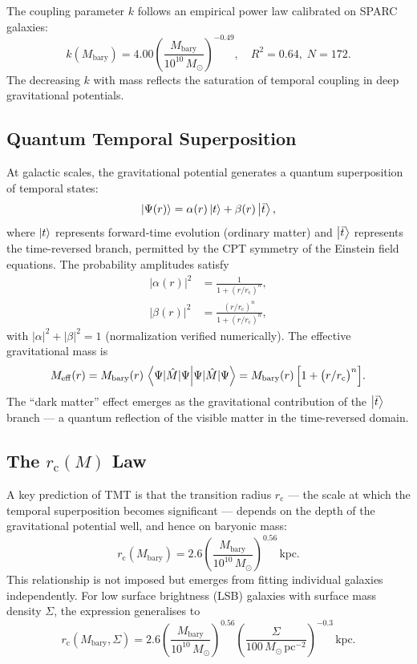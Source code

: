 \documentclass[manuscript,linenumbers]{aastex631}
\newcommand{\Msun}{M_{\odot}}
\newcommand{\Meff}{M_{\mathrm{eff}}}
\newcommand{\Mbary}{M_{\mathrm{bary}}}
\newcommand{\rc}{r_{\mathrm{c}}}
\newcommand{\kpc}{\,\mathrm{kpc}}
\begin{document}
The coupling parameter $k$ follows an empirical power law calibrated
on SPARC galaxies:
\begin{equation}
  k(\Mbary) = 4.00
    \left(\frac{\Mbary}{10^{10}\,\Msun}\right)^{-0.49},
    \quad R^{2} = 0.64,\; N = 172.
  \label{eq:klaw}
\end{equation}
The decreasing $k$ with mass reflects the saturation of temporal
coupling in deep gravitational potentials.

\subsection{Quantum Temporal Superposition}
\label{sec:superposition}

At galactic scales, the gravitational potential generates a quantum
superposition of temporal states:
\begin{equation}
  \ket{\Psi(r)} = \alpha(r)\ket{t} + \beta(r)\ket{\bar{t}},
  \label{eq:superposition}
\end{equation}
where $\ket{t}$ represents forward-time evolution (ordinary matter)
and $\ket{\bar{t}}$ represents the time-reversed branch, permitted by
the CPT symmetry of the Einstein field equations.  The probability
amplitudes satisfy
\begin{align}
  |\alpha(r)|^{2} &= \frac{1}{1 + (r/\rc)^{n}},
  \label{eq:alpha}\\
  |\beta(r)|^{2}  &= \frac{(r/\rc)^{n}}{1 + (r/\rc)^{n}},
  \label{eq:beta}
\end{align}
with $|\alpha|^{2} + |\beta|^{2} = 1$ (normalization verified
numerically).  The effective gravitational mass is
\begin{equation}
  \Meff(r)
    = \Mbary(r)\,\braket{\Psi|\hat{M}|\Psi}
    = \Mbary(r)\,\Bigl[1 + \bigl(r/\rc\bigr)^{n}\Bigr].
  \label{eq:Meff}
\end{equation}
The ``dark matter'' effect emerges as the gravitational contribution
of the $\ket{\bar{t}}$ branch --- a quantum reflection of the visible
matter in the time-reversed domain.

\subsection{\texorpdfstring{The $\rc(M)$ Law}{The rc(M) Law}}
\label{sec:rclaw}

A key prediction of TMT is that the transition radius $\rc$ --- the
scale at which the temporal superposition becomes significant ---
depends on the depth of the gravitational potential well, and hence
on baryonic mass:
\begin{equation}
  \rc(\Mbary) = 2.6
    \left(\frac{\Mbary}{10^{10}\,\Msun}\right)^{0.56}\kpc.
  \label{eq:rclaw}
\end{equation}
This relationship is not imposed but emerges from fitting individual
galaxies independently.  For low surface brightness (LSB) galaxies
with surface mass density $\Sigma$, the expression generalises to
\begin{equation}
  \rc(\Mbary,\Sigma) = 2.6
    \left(\frac{\Mbary}{10^{10}\,\Msun}\right)^{0.56}
    \left(\frac{\Sigma}{100\,\Msun\,\mathrm{pc}^{-2}}\right)^{-0.3}
    \kpc.
  \label{eq:rclaw_lsb}
\end{equation}
\end{document}
